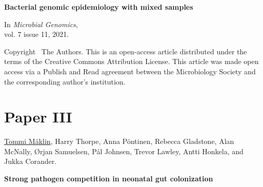 \vspace{10pt}
\noindent\textbf{Bacterial genomic epidemiology with mixed samples}

\vspace{10pt}
\noindent In 
\emph{Microbial Genomics}, 
\\vol. 7 issue 11, 2021.

\vspace{60pt}
\noindent Copyright \textcopyright\ The Authors. This is an
open-access article distributed under the terms of the Creative
Commons Attribution License. This article was made open access via a
Publish and Read agreement between the Microbiology Society and the
corresponding author’s institution.

\cleardoublepage




\chapter*{Paper III}\thispagestyle{plain}







\vspace{80pt}
\underline{Tommi Mäklin}, Harry Thorpe, Anna Pöntinen, Rebecca Gladstone, Alan McNally, Ørjan
Samuelsen, Pål Johnsen, Trevor Lawley, Antti Honkela, and Jukka Corander.

\vspace{10pt}
\noindent\textbf{Strong pathogen competition in neonatal gut colonization}

